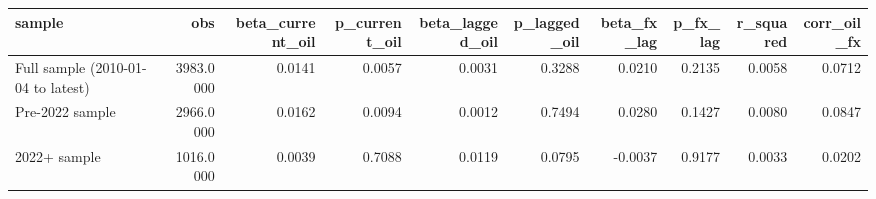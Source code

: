 \begin{tabular}{lrrrrrrrrr}
\toprule
sample & obs & beta\_current\_oil & p\_current\_oil & beta\_lagged\_oil & p\_lagged\_oil & beta\_fx\_lag & p\_fx\_lag & r\_squared & corr\_oil\_fx \\
\midrule
Full sample (2010-01-04 to latest) & 3983.0000 & 0.0141 & 0.0057 & 0.0031 & 0.3288 & 0.0210 & 0.2135 & 0.0058 & 0.0712 \\
Pre-2022 sample & 2966.0000 & 0.0162 & 0.0094 & 0.0012 & 0.7494 & 0.0280 & 0.1427 & 0.0080 & 0.0847 \\
2022+ sample & 1016.0000 & 0.0039 & 0.7088 & 0.0119 & 0.0795 & -0.0037 & 0.9177 & 0.0033 & 0.0202 \\
\bottomrule
\end{tabular}
